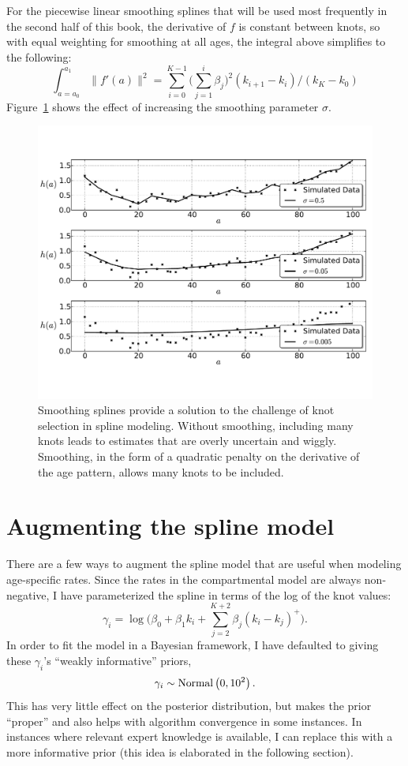 For the piecewise linear smoothing splines that will be used most
frequently in the second half of this book, the derivative of $f$ is
constant between knots, so with equal weighting for smoothing at all
ages, the integral above simplifies to the following:
\[
\int _{a=a_0} ^{a_1} \| f'(a) \|^2
 = \sum_{i=0} ^{K-1} \bigg(
\sum_{j=1} ^{i} \beta_j
\bigg)^2(k_{i+1}-k_i) / (k_K - k_0)
\]
Figure~\ref{smoothing-splines} shows the effect of increasing the
smoothing parameter $\sigma$.

\begin{figure}[h]
\begin{center}
\includegraphics[width=\textwidth]{smoothing-splines.pdf}
\caption{Smoothing splines provide a solution to the challenge of knot
  selection in spline modeling.  Without smoothing, including many
  knots leads to estimates that are overly uncertain and wiggly.
  Smoothing, in the form of a quadratic penalty on the derivative of
  the age pattern, allows many knots to be included.}
\label{smoothing-splines}
\end{center}
\end{figure}


\section{Augmenting the spline model}
There are a few ways to augment the spline model that are useful when
modeling age-specific rates. Since the rates in the compartmental
model are always non-negative, I have parameterized the spline in
terms of the log of the knot values:
\[
\gamma_i = \log\bigg(\beta_0 + \beta_1 k_i + \sum_{j=2}^{K+2} \beta_j (k_i-k_j)^+\bigg).
\]
In order to fit the model in a Bayesian framework, I have defaulted to
giving these $\gamma_i$'s ``weakly informative'' priors,
\[
\gamma_i \sim \operatorname{Normal}\left(0, 10^2\right).
\]
This has very little effect on the posterior distribution, but makes
the prior ``proper'' and also helps with algorithm convergence in
some instances. In instances where relevant expert knowledge is
available, I can replace this with a more informative prior (this idea
is elaborated in the following section).

